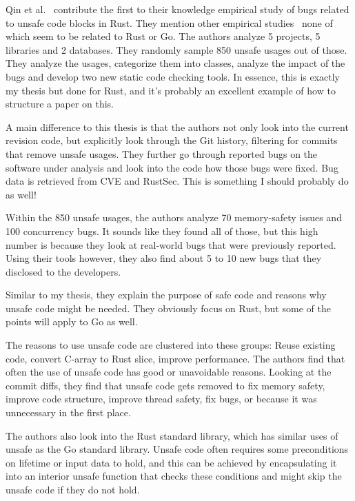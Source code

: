 Qin et al.~\cite{qin2020} contribute the first to their knowledge empirical study of bugs related to unsafe code blocks
in Rust.
They mention other empirical studies~\cite{difranco2017, lu2013, chou2001, leesatapornwongsa2016, jin2012, gunawi2014, gu2015}
none of which seem to be related to Rust or Go.
The authors analyze 5 projects, 5 libraries and 2 databases.
They randomly sample 850 unsafe usages out of those.
They analyze the usages, categorize them into classes, analyze the impact of the bugs and develop two new static code
checking tools.
In essence, this is exactly my thesis but done for Rust, and it's probably an excellent example of how to structure a
paper on this.

A main difference to this thesis is that the authors not only look into the current revision code, but explicitly look
through the Git history, filtering for commits that remove unsafe usages.
They further go through reported bugs on the software under analysis and look into the code how those bugs were fixed.
Bug data is retrieved from CVE and RustSec.
This is something I should probably do as well!

Within the 850 unsafe usages, the authors analyze 70 memory-safety issues and 100 concurrency bugs.
It sounds like they found all of those, but this high number is because they look at real-world bugs that were previously
reported.
Using their tools however, they also find about 5 to 10 new bugs that they disclosed to the developers.

Similar to my thesis, they explain the purpose of safe code and reasons why unsafe code might be needed.
They obviously focus on Rust, but some of the points will apply to Go as well.

The reasons to use unsafe code are clustered into these groups: Reuse existing code, convert C-array to Rust slice,
improve performance.
The authors find that often the use of unsafe code has good or unavoidable reasons.
Looking at the commit diffs, they find that unsafe code gets removed to fix memory safety, improve code structure,
improve thread safety, fix bugs, or because it was unnecessary in the first place.

The authors also look into the Rust standard library, which has similar uses of unsafe as the Go standard library.
Unsafe code often requires some preconditions on lifetime or input data to hold, and this can be achieved by encapsulating
it into an interior unsafe function that checks these conditions and might skip the unsafe code if they do not hold.

